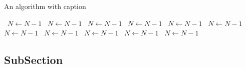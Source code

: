 \documentclass[a4paper]{article}
\begin{document}
\begin{algorithm}
\caption{An algorithm with caption}
\begin{algorithmic}
\    \State $N \gets N - 1$
\    \State $N \gets N - 1$
\    \State $N \gets N - 1$
\    \State $N \gets N - 1$
\    \State $N \gets N - 1$
\    \State $N \gets N - 1$
\    \State $N \gets N - 1$
\    \State $N \gets N - 1$
\    \State $N \gets N - 1$
\    \State $N \gets N - 1$
\    \State $N \gets N - 1$
\EndWhile
\end{algorithmic}
\end{algorithm}

\subsection{SubSection}
\end{document}
